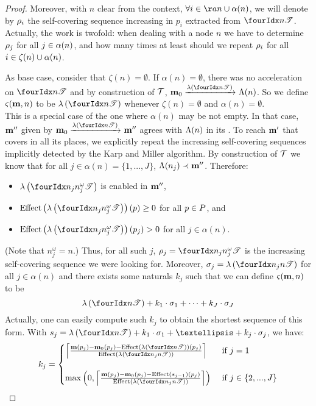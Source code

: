 \begin{proof}
  Moreover, with $n$ clear from the context, $\forall i \in \aa{n} \cup \na{n}$, we will denote by $\iscs{i}$ the self-covering sequence increasing in $p_i$ extracted from $\treepath{n}$.
  Actually, the work is twofold: when dealing with a node $n$ we have to determine $\iscs{j}$ for all $j \in \operatorname{\alpha}(n)$, and how many times at least should we repeat $\iscs{i}$ for all $i \in \operatorname{\zeta}(n) \cup \operatorname{\alpha}(n)$.


  As base case, consider that $\zeta(n) = \emptyset$.
  If $\alpha(n) = \emptyset$, there was no acceleration on $\treepath{n}$ and by construction of $\mathcal{T}$, $\mari \fire{\labt{\treepath{n}}} \lab{n}$.
  So we define $\operatorname{\varsigma}(\mathbf{m},n)$ to be $\labt{\treepath{n}}$ whenever $\zeta(n) = \emptyset$ and $\alpha(n) = \emptyset$.\\
  This is a special case of the one where $\alpha(n)$ may be not empty.
  In that case, $\mathbf{m}''$ given by $\mari \fire{\labt{\treepath{n}}} \mar''$ agrees with $\operatorname{\Lambda}(n)$ in its \noplaces.
  To reach $\mathbf{m}'$ that covers \mar in all its places, we explicitly repeat the increasing self-covering sequences implicitly detected by the Karp and Miller algorithm.
  By construction of $\mathcal{T}$ we know that for all $j \in \alpha(n) = \{1, ..., J\}$, $\operatorname{\Lambda}(n_j) \prec \mathbf{m}''$.
  Therefore:
  \begin{itemize}
    \item $\labt{\treepath[n_j]{n^\omega_j}}$ is enabled in $\mathbf{m}''$,
    \item $\effect{\labt{\treepath[n_j]{n^\omega_j}}}(p) \geq 0$ for all $p \in P$, and
    \item $\effect{\labt{\treepath[n_j]{n^\omega_j}}}(p_j) > 0$ for all $j \in \alpha(n)$.
  \end{itemize}
  (Note that $n^\omega_j = n$.)
  Thus, for all such $j$, $\iscs{j} = \treepath[n_j]{n^\omega_j}$ is the increasing self-covering sequence we were looking for.
  Moreover, %
  $\seqt_j = \labt{\treepath[n_j]{n}}$ for all $j \in \alpha(n)$
  and
  there exists some naturals $k_j$ such that we can define $\operatorname{\varsigma}(\mathbf{m},n)$ to be
  \[ \labt{\treepath{n}} + k_1 \cdot \seqt_1 + \dots + k_J \cdot \seqt_J \] 
  Actually, one can easily compute such $k_j$ to obtain the shortest sequence of this form.
  With $s_j = \labt{\treepath{n}} + k_1 \cdot \seqt_1 + … + k_j \cdot \seqt_j$, we have:
  \[
    k_j =
    \begin{cases}
      \left\lceil
        \frac{\mar(p_j) - \mari(p_j) - \effect{\labt{\treepath{n}}}(p_j)}
            {\effect{\labt{\treepath[n_j]{n}}}}
      \right\rceil
      &\text{ if } j = 1\\
      \\
      \max\left(0,
        \left\lceil
          \frac{\mar(p_j) - \mari(p_j) - \effect{s_{j-1}}(p_j)}
              {\effect{\labt{\treepath[n_j]{n}}}}
        \right\rceil
      \right)
      &\text{ if } j \in \{2, ..., J\}
    \end{cases}
  \]


\end{proof}
